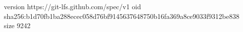 version https://git-lfs.github.com/spec/v1
oid sha256:b1d70fb1ba288ecec058d76bf9145637648750b16fa369a8ce9033f9312be838
size 9242
